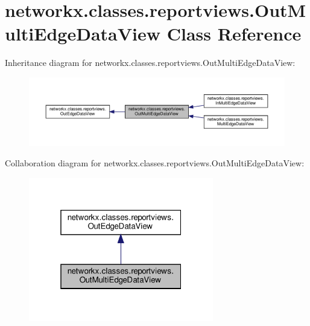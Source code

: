 \hypertarget{classnetworkx_1_1classes_1_1reportviews_1_1OutMultiEdgeDataView}{}\section{networkx.\+classes.\+reportviews.\+Out\+Multi\+Edge\+Data\+View Class Reference}
\label{classnetworkx_1_1classes_1_1reportviews_1_1OutMultiEdgeDataView}


Inheritance diagram for networkx.\+classes.\+reportviews.\+Out\+Multi\+Edge\+Data\+View\+:
\nopagebreak
\begin{figure}[H]
\begin{center}
\leavevmode
\includegraphics[width=350pt]{classnetworkx_1_1classes_1_1reportviews_1_1OutMultiEdgeDataView__inherit__graph}
\end{center}
\end{figure}


Collaboration diagram for networkx.\+classes.\+reportviews.\+Out\+Multi\+Edge\+Data\+View\+:
\nopagebreak
\begin{figure}[H]
\begin{center}
\leavevmode
\includegraphics[width=229pt]{classnetworkx_1_1classes_1_1reportviews_1_1OutMultiEdgeDataView__coll__graph}
\end{center}
\end{figure}
